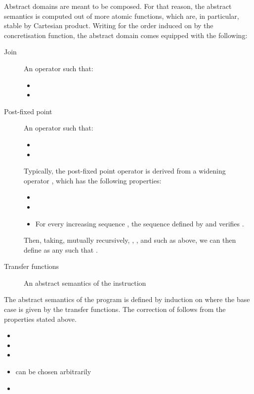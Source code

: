 \documentclass[]{llncs}
\begin{document}
\par
Abstract domains are meant to be composed. For that reason, the abstract semantics  is computed out of more atomic functions, which are, in particular, stable by Cartesian product. Writing  for the order induced on  by the concretisation function, the abstract domain comes equipped with the following:
  \begin{description}
    \item[Join] An operator  such that:
    \begin{itemize}
      \item 
      \item 
    \end{itemize}
    \item[Post-fixed point] An operator  such that:
    \begin{itemize}
      \item 
      \item 
    \end{itemize}
\par
Typically, the post-fixed point operator is derived from a widening operator , which has the following properties:
    \begin{itemize}
      \item 
      \item 
      \item For every increasing sequence , the sequence  defined by  and  verifies .
    \end{itemize}
    Then, taking, mutually recursively, , , and  such as above, we can then define  as any  such that .
    \item[Transfer functions] An abstract semantics  of the instruction 
  \end{description}
\par
The abstract semantics  of the program  is defined by induction on  where the base case is given by the transfer functions. The correction of  follows from the properties stated above.
  \begin{itemize}
    \item 
    \item 
    \item 
    \item  can be chosen arbitrarily
    \item 
  \end{itemize}
\par
\par
\end{document}

